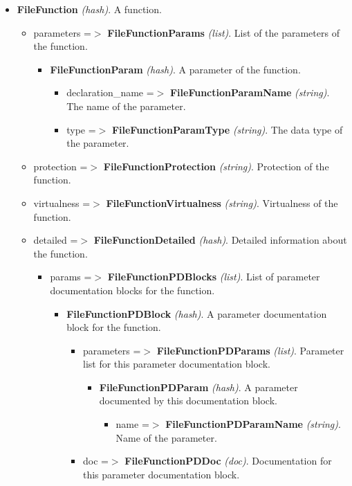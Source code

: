\begin{itemize}
\begin{itemize}
\begin{itemize}
\begin{itemize}
\begin{itemize}
\begin{itemize}
\item {\bf FileFunction} {\em (hash)\/}. A function. \begin{itemize}
\item parameters =$>$ {\bf FileFunctionParams} {\em (list)\/}. List of the parameters of the function. \begin{itemize}
\item {\bf FileFunctionParam} {\em (hash)\/}. A parameter of the function. \begin{itemize}
\item declaration\_\-name =$>$ {\bf FileFunctionParamName} {\em (string)\/}. The name of the parameter. \item type =$>$ {\bf FileFunctionParamType} {\em (string)\/}. The data type of the parameter. \end{itemize}
\end{itemize}
\item protection =$>$ {\bf FileFunctionProtection} {\em (string)\/}. Protection of the function. \item virtualness =$>$ {\bf FileFunctionVirtualness} {\em (string)\/}. Virtualness of the function. \item detailed =$>$ {\bf FileFunctionDetailed} {\em (hash)\/}. Detailed information about the function. \begin{itemize}
\item params =$>$ {\bf FileFunctionPDBlocks} {\em (list)\/}. List of parameter documentation blocks for the function. \begin{itemize}
\item {\bf FileFunctionPDBlock} {\em (hash)\/}. A parameter documentation block for the function. \begin{itemize}
\item parameters =$>$ {\bf FileFunctionPDParams} {\em (list)\/}. Parameter list for this parameter documentation block. \begin{itemize}
\item {\bf FileFunctionPDParam} {\em (hash)\/}. A parameter documented by this documentation block. \begin{itemize}
\item name =$>$ {\bf FileFunctionPDParamName} {\em (string)\/}. Name of the parameter. \end{itemize}
\end{itemize}
\item doc =$>$ {\bf FileFunctionPDDoc} {\em (doc)\/}. Documentation for this parameter documentation block. \end{itemize}

\end{itemize}
\end{itemize}
\end{itemize}
\end{itemize}
\end{itemize}
\end{itemize}
\end{itemize}
\end{itemize}
\end{itemize}
